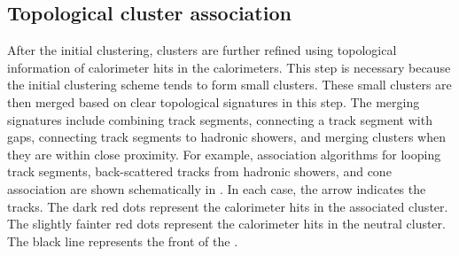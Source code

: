 \subsection{Topological cluster association}

After the initial clustering, clusters are further refined using topological information of calorimeter hits in the calorimeters. This step is necessary because the initial clustering scheme tends to form small clusters. These small clusters are then merged  based on clear topological signatures in this step. The merging signatures include combining track segments, connecting a track segment with gaps, connecting track segments to  hadronic showers, and merging clusters when they are within close proximity. For example, association algorithms  for looping track segments, back-scattered tracks from hadronic showers, and cone association are shown schematically in . In each case, the arrow indicates the tracks. The dark red dots represent the calorimeter hits in the associated cluster. The slightly fainter red dots represent the calorimeter hits in the neutral cluster. The black line represents the front of the \ECAL.

